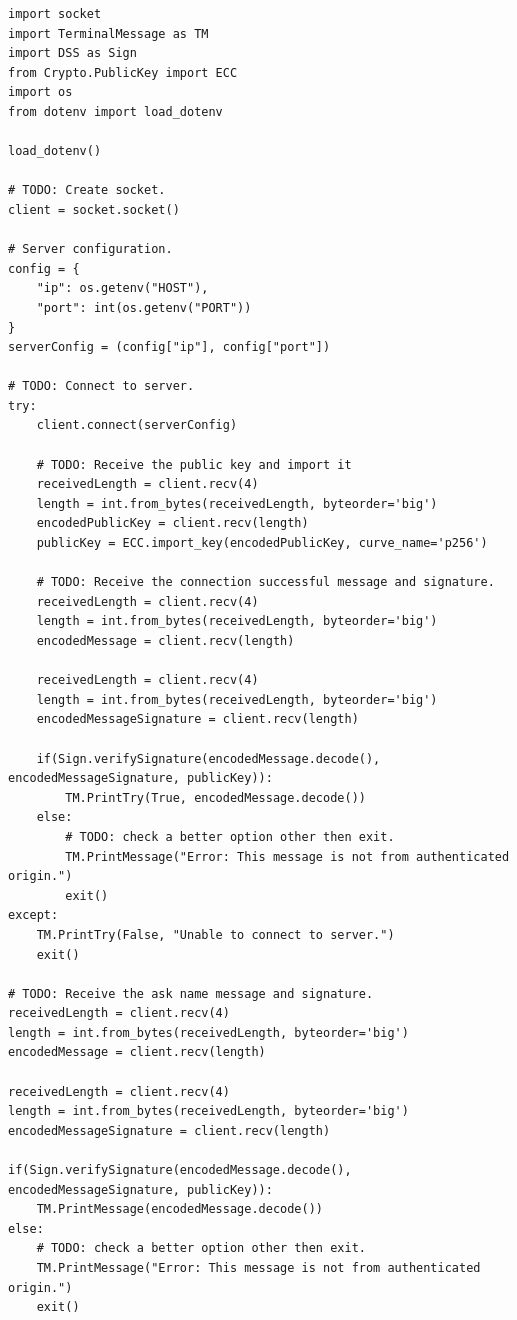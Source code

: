 \begin{lstlisting}[style=mypython, caption={client.py}, label={code:A-2-b-client}]
import socket
import TerminalMessage as TM
import DSS as Sign
from Crypto.PublicKey import ECC
import os
from dotenv import load_dotenv

load_dotenv()

# TODO: Create socket.
client = socket.socket()

# Server configuration.
config = {
    "ip": os.getenv("HOST"),
    "port": int(os.getenv("PORT"))
}
serverConfig = (config["ip"], config["port"])

# TODO: Connect to server.
try:
    client.connect(serverConfig)

    # TODO: Receive the public key and import it
    receivedLength = client.recv(4)
    length = int.from_bytes(receivedLength, byteorder='big')
    encodedPublicKey = client.recv(length)
    publicKey = ECC.import_key(encodedPublicKey, curve_name='p256')

    # TODO: Receive the connection successful message and signature.
    receivedLength = client.recv(4)
    length = int.from_bytes(receivedLength, byteorder='big')
    encodedMessage = client.recv(length)

    receivedLength = client.recv(4)
    length = int.from_bytes(receivedLength, byteorder='big')
    encodedMessageSignature = client.recv(length)

    if(Sign.verifySignature(encodedMessage.decode(), encodedMessageSignature, publicKey)):
        TM.PrintTry(True, encodedMessage.decode())
    else:
        # TODO: check a better option other then exit.
        TM.PrintMessage("Error: This message is not from authenticated origin.")
        exit()
except:
    TM.PrintTry(False, "Unable to connect to server.")
    exit()

# TODO: Receive the ask name message and signature.
receivedLength = client.recv(4)
length = int.from_bytes(receivedLength, byteorder='big')
encodedMessage = client.recv(length)

receivedLength = client.recv(4)
length = int.from_bytes(receivedLength, byteorder='big')
encodedMessageSignature = client.recv(length)

if(Sign.verifySignature(encodedMessage.decode(), encodedMessageSignature, publicKey)):
    TM.PrintMessage(encodedMessage.decode())
else:
    # TODO: check a better option other then exit.
    TM.PrintMessage("Error: This message is not from authenticated origin.")
    exit()


\end{lstlisting}

